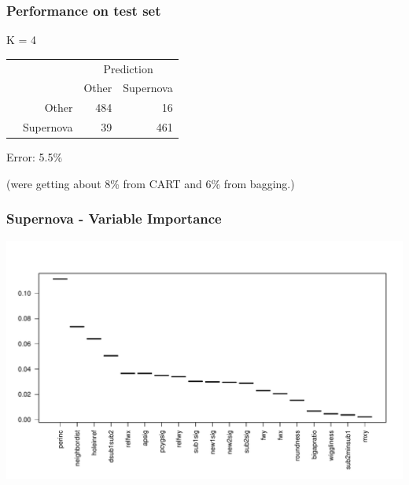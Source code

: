 \documentclass{beamer}
\begin{document}
\begin{frame}
	\frametitle{Performance on test set}
	K = 4
	\begin{table}
	\begin{tabular}{cr|rr}
	& & \multicolumn{2}{c}{Prediction}\\
	& & Other & Supernova\\
	\hline
	\multirow{2}{*}{\rotatebox{90}{Actual}} & Other &  484 &  16\\
	& Supernova & 39 &  461\\
	\end{tabular}
	\end{table}
	Error: 5.5\%
	
	(were getting about 8\% from CART and 6\% from bagging.)
\end{frame}

\begin{frame}
	\frametitle{Supernova - Variable Importance}
	\includegraphics{imp.pdf}
\end{frame}
\end{document}
